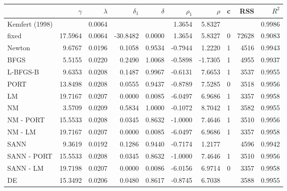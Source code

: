 \begin{tabular}{lrrrrrrrrr}
  \hline
 & $\gamma$ & $\lambda$ & $\delta_1$ & $\delta$ & $\rho_1$ & $\rho$ & c & RSS & $R^2$ \\ 
  \hline
Kemfert (1998) &  & 0.0064 &  &  & 1.3654 & 5.8327 &  &  & 0.9986 \\ 
  \color{red} fixed & \color{red} 17.5964 & \color{red} 0.0064 & \color{red} -30.8482 & \color{red} 0.0000 & \color{red} 1.3654 & \color{red} 5.8327 & \color{red} 0 & \color{red} 72628 & \color{red} 0.9083 \\ 
  Newton & 9.6767 & 0.0196 & 0.1058 & 0.9534 & -0.7944 & 1.2220 & 1 & 4516 & 0.9943 \\ 
  \color{red} BFGS & \color{red} 5.5155 & \color{red} 0.0220 & \color{red} 0.2490 & \color{red} 1.0068 & \color{red} -0.5898 & \color{red} -1.7305 & \color{red} 1 & \color{red} 4955 & \color{red} 0.9937 \\ 
  L-BFGS-B & 9.6353 & 0.0208 & 0.1487 & 0.9967 & -0.6131 & 7.6653 & 1 & 3537 & 0.9955 \\ 
  PORT & 13.8498 & 0.0208 & 0.0555 & 0.9437 & -0.8789 & 7.5285 & 0 & 3518 & 0.9956 \\ 
  \color{red} LM & \color{red} 19.7167 & \color{red} 0.0207 & \color{red} 0.0000 & \color{red} 0.0085 & \color{red} -6.0497 & \color{red} 6.9686 & \color{red} 1 & \color{red} 3357 & \color{red} 0.9958 \\ 
  NM & 3.5709 & 0.0209 & 0.5834 & 1.0000 & -0.1072 & 8.7042 & 1 & 3582 & 0.9955 \\ 
  NM - PORT & 15.5533 & 0.0208 & 0.0345 & 0.8632 & -1.0000 & 7.4646 & 1 & 3510 & 0.9956 \\ 
  \color{red} NM - LM & \color{red} 19.7167 & \color{red} 0.0207 & \color{red} 0.0000 & \color{red} 0.0085 & \color{red} -6.0497 & \color{red} 6.9686 & \color{red} 1 & \color{red} 3357 & \color{red} 0.9958 \\ 
  SANN & 9.3619 & 0.0192 & 0.1286 & 0.9440 & -0.7174 & 1.2177 &  & 4596 & 0.9942 \\ 
  SANN - PORT & 15.5533 & 0.0208 & 0.0345 & 0.8632 & -1.0000 & 7.4646 & 1 & 3510 & 0.9956 \\ 
  \color{red} SANN - LM & \color{red} 19.7198 & \color{red} 0.0207 & \color{red} 0.0000 & \color{red} 0.0086 & \color{red} -6.0156 & \color{red} 6.9714 & \color{red} 0 & \color{red} 3357 & \color{red} 0.9958 \\ 
  DE & 15.3492 & 0.0206 & 0.0480 & 0.8617 & -0.8745 & 6.7038 &  & 3588 & 0.9955 \\ 

\end{tabular}
